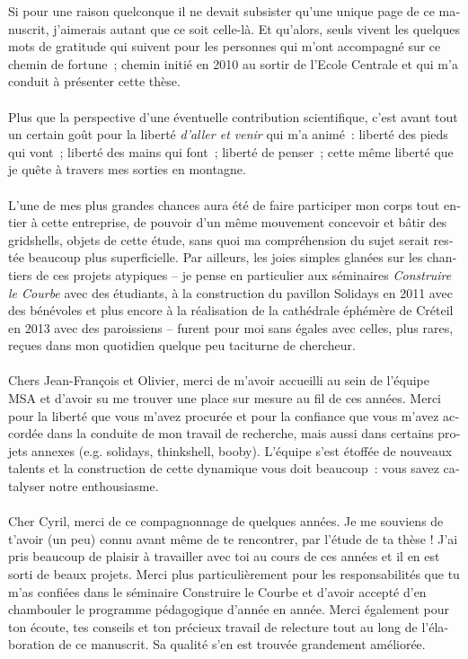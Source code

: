 \begin{otherlanguage}{french}
Si pour une raison quelconque il ne devait subsister qu'une unique page de ce manuscrit, j'aimerais autant que ce soit celle-là. Et qu'alors, seuls vivent les quelques mots de gratitude qui suivent pour les personnes qui m'ont accompagné sur ce chemin de fortune~; chemin initié en 2010 au sortir de l'Ecole Centrale et qui m'a conduit à présenter cette thèse.
\\
\\
Plus que la perspective d'une éventuelle contribution scientifique, c'est avant tout un certain goût pour la liberté \emph{d'aller et venir} qui m'a animé~: liberté des pieds qui vont~; liberté des mains qui font~; liberté de penser~; cette même liberté que je quête à travers mes sorties en montagne.
\\
\\
L'une de mes plus grandes chances aura été de faire participer mon corps tout entier à cette entreprise, de pouvoir d'un même mouvement concevoir et bâtir des gridshells, objets de cette étude, sans quoi ma compréhension du sujet serait restée beaucoup plus superficielle. Par ailleurs, les joies simples glanées sur les chantiers de ces projets atypiques -- je pense en particulier aux séminaires \emph{Construire le Courbe} avec des étudiants, à la construction du pavillon Solidays en 2011 avec des bénévoles et plus encore à la réalisation de la cathédrale éphémère de Créteil en 2013 avec des paroissiens -- furent pour moi sans égales avec celles, plus rares, reçues dans mon quotidien quelque peu taciturne de chercheur.
\\
\\
Chers Jean-François et Olivier, merci de m'avoir accueilli au sein de l'équipe MSA et d'avoir su me trouver une place sur mesure au fil de ces années. Merci pour la liberté que vous m'avez procurée et pour la confiance que vous m'avez accordée dans la conduite de mon travail de recherche, mais aussi dans certains projets annexes (e.g. solidays, thinkshell, booby). L'équipe s'est étoffée de nouveaux talents et la construction de cette dynamique vous doit beaucoup~: vous savez catalyser notre enthousiasme.
\\
\\
Cher Cyril, merci de ce compagnonnage de quelques années. Je me souviens de t'avoir (un peu) connu avant même de te rencontrer, par l'étude de ta thèse ! J'ai pris beaucoup de plaisir à travailler avec toi au cours de ces années et il en est sorti de beaux projets. Merci plus particulièrement pour les responsabilités que tu m'as confiées dans le séminaire Construire le Courbe et d'avoir accepté d'en chambouler le programme pédagogique d'année en année. Merci également pour ton écoute, tes conseils et ton précieux travail de relecture tout au long de l'élaboration de ce manuscrit. Sa qualité s'en est trouvée grandement améliorée.

\end{otherlanguage}
